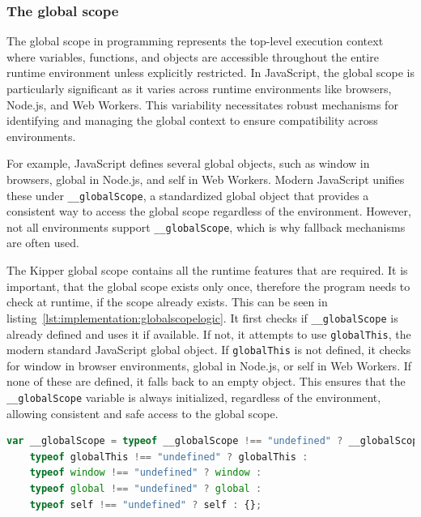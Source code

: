 \subsubsection{The global scope}

The global scope in programming represents the top-level execution context where variables, functions, and objects are accessible throughout the entire runtime environment unless explicitly restricted. In JavaScript, the global scope is particularly significant as it varies across runtime environments like browsers, Node.js, and Web Workers. This variability necessitates robust mechanisms for identifying and managing the global context to ensure compatibility across environments.

For example, JavaScript defines several global objects, such as window in browsers, global in Node.js, and self in Web Workers. Modern JavaScript unifies these under \lstinline|__globalScope|, a standardized global object that provides a consistent way to access the global scope regardless of the environment. However, not all environments support \lstinline|__globalScope|, which is why fallback mechanisms are often used.

The Kipper global scope contains all the runtime features that are required. It is important, that the global scope exists only once, therefore the program needs to check at runtime, if the scope already exists. This can be seen in listing~\ref{lst:implementation:globalscopelogic}. It first checks if \lstinline|__globalScope| is already defined and uses it if available. If not, it attempts to use \lstinline|globalThis|, the modern standard JavaScript global object. If \lstinline|globalThis| is not defined, it checks for window in browser environments, global in Node.js, or self in Web Workers. If none of these are defined, it falls back to an empty object. This ensures that the \lstinline|__globalScope| variable is always initialized, regardless of the environment, allowing consistent and safe access to the global scope.

\begin{lstlisting}[language=TypeScript,caption=Global Scope Logic,label=lst:implementation:globalscopelogic]
var __globalScope = typeof __globalScope !== "undefined" ? __globalScope :
    typeof globalThis !== "undefined" ? globalThis :
    typeof window !== "undefined" ? window :
    typeof global !== "undefined" ? global :
    typeof self !== "undefined" ? self : {};
\end{lstlisting}

